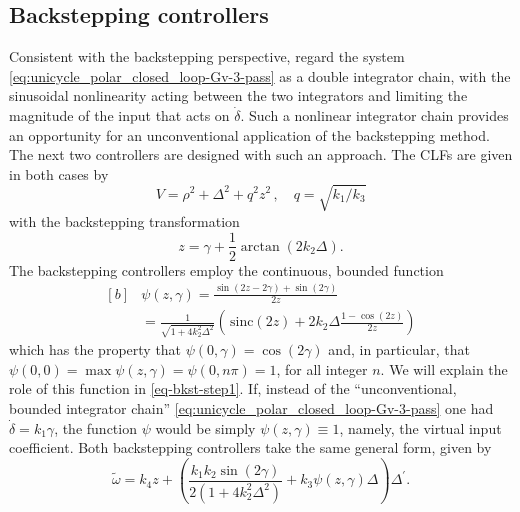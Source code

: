 \documentclass[journal,twoside,web]{ieeecolor}
\theoremstyle{definition}
\begin{document}
\subsection{Backstepping controllers}
Consistent with the backstepping perspective, regard the system \eqref{eq:unicycle_polar_closed_loop-Gv-3-pass} as a double integrator chain, with the sinusoidal nonlinearity acting between the two integrators and limiting the magnitude of the input that acts on $\dot\delta$. Such a nonlinear integrator chain provides an opportunity for an unconventional application of the backstepping method. The next two controllers are designed with such an approach. The CLFs are given in both cases by
\begin{equation}
\label{eq-bkst-CLF-common}
V = 
\rho^2+ \Delta^2 + q^2z^2\,, \quad q = \sqrt{k_1/k_3}
\end{equation}
with the backstepping transformation
\begin{equation}
z = \gamma + \frac{1}{2} \arctan(2k_2 \Delta).
\end{equation}
 The backstepping controllers employ the continuous, bounded function
\begin{equation}
\begin{aligned}[b]
&\psi(z,\gamma) = \frac{\sin(2z-2\gamma) +\sin(2\gamma)}{2z}
\\
 &= \frac{1}{\sqrt{1 + 4k_2^2 \Delta^2}} \left(\,\mbox{sinc}(2z)
+ 2k_2 \Delta \frac{1 - \cos(2z)}{2z}\right)
 \label{eq:psi_definition}
\end{aligned}
\end{equation}
which has the property that $\psi(0,\gamma)  = \cos(2\gamma)$ and, in particular, that $\psi(0,0) = \max\psi(z,\gamma)= \psi(0,n\pi) = 1$, for all integer $n$. We will explain the role of this function in \eqref{eq-bkst-step1}. If, instead of the ``unconventional, bounded integrator chain'' \eqref{eq:unicycle_polar_closed_loop-Gv-3-pass} one had $\dot\delta = k_1 \gamma$, the function $\psi$ would be simply $\psi(z,\gamma)\equiv 1$, namely, the virtual input coefficient. 
Both backstepping controllers take the same general form, given by
\begin{equation}
\tilde\omega = k_4 z +  \left( \frac{k_1k_2 \sin(2\gamma)}{2(1+4k_2^2 \Delta^2)} + k_3 \psi(z,\gamma)\Delta \right)\Delta^{\prime}.
\label{eq:backstepping_controllers}
\end{equation}
\end{document}
